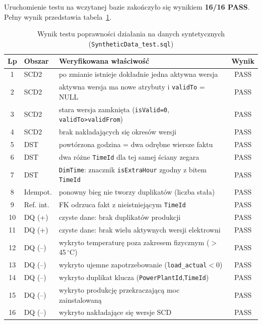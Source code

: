 \documentclass[12pt]{article}
\begin{document}
	\noindent Uruchomienie testu na wczytanej bazie zakończyło się wynikiem \textbf{16/16 PASS}. Pełny wynik przedstawia tabela~\ref{tab:synttest}.

	\begin{table}[H]
		\centering
		\small
		\begin{tabularx}{\textwidth}{|c|p{2.0cm}|X|c|}
			\hline
			\textbf{Lp} & \textbf{Obszar} & \textbf{Weryfikowana właściwość} & \textbf{Wynik} \\
			\hline
			1  & SCD2   & po zmianie istnieje dokładnie jedna aktywna wersja & PASS \\ \hline
			2  & SCD2   & aktywna wersja ma nowe atrybuty i \texttt{validTo} = NULL & PASS \\ \hline
			3  & SCD2   & stara wersja zamknięta (\texttt{isValid=0}, \texttt{validTo>validFrom}) & PASS \\ \hline
			4  & SCD2   & brak nakładających się okresów wersji & PASS \\ \hline
			5  & DST    & powtórzona godzina = dwa odrębne wiersze faktu & PASS \\ \hline
			6  & DST    & dwa różne \texttt{TimeId} dla tej samej ściany zegara & PASS \\ \hline
			7  & DST    & \texttt{DimTime}: znacznik \texttt{isExtraHour} zgodny z bitem \texttt{TimeId} & PASS \\ \hline
			8  & Idempot. & ponowny bieg nie tworzy duplikatów (liczba stała) & PASS \\ \hline
			9  & Ref. int. & FK odrzuca fakt z nieistniejącym \texttt{TimeId} & PASS \\ \hline
			10 & DQ (+) & czyste dane: brak duplikatów produkcji & PASS \\ \hline
			11 & DQ (+) & czyste dane: brak wielu aktywnych wersji elektrowni & PASS \\ \hline
			12 & DQ (--) & wykryto temperaturę poza zakresem fizycznym ($>$45\,$^\circ$C) & PASS \\ \hline
			13 & DQ (--) & wykryto ujemne zapotrzebowanie (\texttt{load\_actual}$<$0) & PASS \\ \hline
			14 & DQ (--) & wykryto duplikat klucza (\texttt{PowerPlantId},\texttt{TimeId}) & PASS \\ \hline
			15 & DQ (--) & wykryto produkcję przekraczającą moc zainstalowaną & PASS \\ \hline
			16 & DQ (--) & wykryto nakładające się wersje SCD & PASS \\ \hline
		\end{tabularx}
		\caption{Wynik testu poprawności działania na danych syntetycznych (\texttt{SyntheticData\_test.sql})}
		\label{tab:synttest}
	\end{table}
\end{document}

